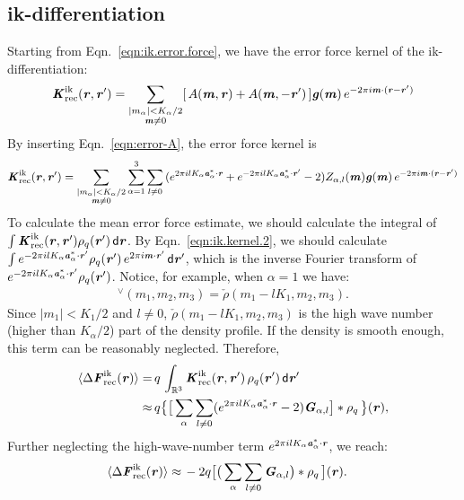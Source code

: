 \documentclass[aps,pre,preprint,unsortedaddress]{revtex4}
\renewcommand{\v}[1]{\textbf{\textit{#1}}}
\renewcommand{\d}[1]{\textsf{#1}}
\begin{document}
\subsection{ik-differentiation}
Starting from Eqn.~\eqref{eqn:ik.error.force}, we have the error force kernel
of the ik-differentiation:
\begin{align}
  \v K^{\textrm{ik}}_{\textrm{rec}}(\v r, \v r')
  =
  \sum_{
    \begin{subarray}{c}
      \vert m_{\alpha}\vert < K_\alpha/2\\
      \v m\neq 0
    \end{subarray}}
  [\,A(\v m, \v r) + A(\v m,-\v r')\,]
  \v g(\v m)\,e^{-2\pi i\v m\cdot(\v r-\v r')}
\end{align}
By inserting Eqn.~\eqref{eqn:error-A}, the error force kernel is
\begin{align}
  \label{eqn:ik.kernel.2}
  \v K^{\textrm{ik}}_{\textrm{rec}}(\v r, \v r')
  =
  \sum_{
    \begin{subarray}{c}
      \vert m_{\alpha}\vert < K_\alpha/2\\
      \v m\neq 0
    \end{subarray}}
  \sum_{\alpha=1}^3\sum_{l\neq 0}
  \,(
  e^{2\pi i l K_\alpha\v a^\ast_\alpha\cdot \v r} +
  e^{-2\pi i l K_\alpha\v a^\ast_\alpha\cdot \v r'}
  - 2
  )
  Z_{\alpha,l}(\v m)
  \v g(\v m)\,e^{-2\pi i\v m\cdot(\v r-\v r')}
\end{align}
To calculate the mean error force estimate, we should
calculate the integral of
$\int \v K^{\textrm{ik}}_{\textrm{rec}}(\v r, \v r')\rho_q(\v r')\,\d d\v r$.
By Eqn.~\eqref{eqn:ik.kernel.2}, we should calculate
$  \int e^{-2\pi i l K_\alpha\v a^\ast_\alpha\cdot \v r'}\rho_q(\v r')
\,e^{2\pi i\v m\cdot\v r'}\,\d d\v r'$, which is the inverse Fourier transform
of $e^{-2\pi i l K_\alpha\v a^\ast_\alpha\cdot \v r'}\rho_q(\v r')$. Notice,
for example, when $\alpha=1$ we have:
\begin{align}
  [\,\rho_q(\v r')\,e^{-2\pi i l K_1\v a^\ast_1\cdot \v r'}\,] ^\vee
  (m_1, m_2, m_3)
  = \check\rho(m_1-lK_1, m_2, m_3).
\end{align}
Since $\vert m_1\vert < K_1/2$ and $l\neq 0$,
$\check\rho(m_1-lK_1, m_2, m_3)$ is
the high wave number (higher than $K_\alpha / 2$) part of the density profile.
If the density is smooth enough, this term can be reasonably neglected.
Therefore,
\begin{align}\nonumber
  \langle\Delta\v F^{\textrm{ik}}_{\textrm{rec}}(\v r)\rangle
  =\,&
  q\, \int_{\mathbb R^3}
  \v K^{\textrm{ik}}_{\textrm{rec}} (\v r,\v r')\,\rho_q(\v r')\,\d d\v r'\\
  \approx\,&
  q
  \big\{
  \big[
  \sum_{\alpha}\sum_{l\neq 0}
  (e^{2\pi i l K_\alpha\v a^\ast_\alpha\cdot \v r}   - 2 )
  \v G_{\alpha,l}
  \big]
  \ast\rho_q\,
  \big\} (\v r),
\end{align}
Further neglecting the
high-wave-number term $e^{2\pi i l K_\alpha\v a^\ast_\alpha\cdot \v r}$, we reach:
\begin{align}
  \langle\Delta\v F^{\textrm{ik}}_{\textrm{rec}}(\v r)\rangle
  \approx\,&
  -2q
  \big[
  \big(
  \sum_{\alpha}\sum_{l\neq 0}\v G_{\alpha,l}
  \big)
  \ast\rho_q\,
  \big] (\v r).
\end{align}
\end{document}
